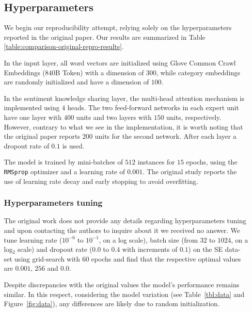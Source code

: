 \subsection{Hyperparameters}
We begin our reproducibility attempt, relying solely on the hyperparameters reported in the original paper. Our results are summarized in Table \ref{table:comparison-original-repro-results}.

In the input layer, all word vectors are initialized using Glove Common Crawl Embeddings ($840$B Token) \cite{pennington2014} with a dimension of $300$, while category embeddings are randomly initialized and have a dimension of $100$.

In the sentiment knowledge sharing layer, the multi-head attention mechanism is implemented using $4$ heads. The two feed-forward networks in each expert unit have one layer with $400$ units and two layers with $150$ units, respectively. However, contrary to what we see in the implementation, it is worth noting that the original paper reports $200$ units for the second network. After each layer a dropout rate of $0.1$ is used.

The model is trained by mini-batches of $512$ instances for $15$ epochs, using the \texttt{RMSprop} optimizer and a learning rate of $0.001$. The original study reports the use of learning rate decay and early stopping to avoid overfitting.


\subsubsection{Hyperparameters tuning}
The original work does not provide any details regarding hyperparameters tuning and upon contacting the authors to inquire about it we received no answer. We tune learning rate ($10^{-6}$ to $10^{-1}$, on a log scale), batch size (from $32$ to $1024$, on a log$_2$ scale) and dropout rate ($0.0$ to $0.4$ with increments of $0.1$) on the SE data-set using grid-search with $60$ epochs and find that the respective optimal values are $0.001$, $256$ and $0.0$.

Despite discrepancies with the original values the model's performance remains similar. In this respect, considering the model variation (see Table~\ref{tbl:data} and Figure~\ref{fig:data}), any differences are likely due to random initialization.


